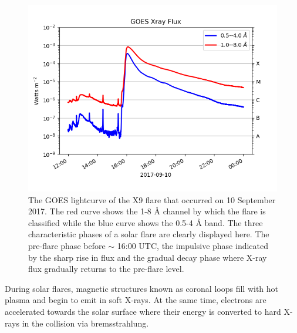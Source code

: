 \begin{figure}[ht]
    \centering
    \includegraphics[width=\columnwidth]{Images/GOES_Xclass.png}
    \caption[GOES lightcurve for X9 class flare on 2017-09-10.]{The GOES lightcurve of the X9 flare that occurred on 10 September 2017. The red curve shows the 1-8 {\AA} channel by which the flare is classified while the blue curve shows the 0.5-4 {\AA} band. The three characteristic phases of a solar flare are clearly displayed here. The pre-flare phase before $\sim$ 16:00 UTC, the impulsive phase indicated by the sharp rise in flux and the gradual decay phase where X-ray flux gradually returns to the pre-flare level.}
    \label{fig:GOES_Xclass}
\end{figure}
During solar flares, magnetic structures known as coronal loops fill with hot plasma and begin to emit in soft X-rays. At the same time, electrons are accelerated towards the solar surface where their energy is converted to hard X-rays in the collision via bremsstrahlung. 


